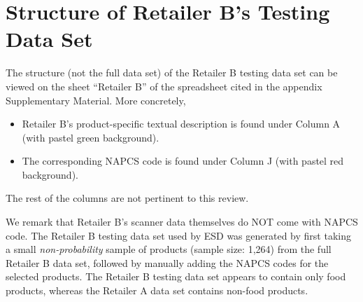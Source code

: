 
\section{Structure of Retailer B's Testing Data Set}
\setcounter{theorem}{0}
\setcounter{equation}{0}



The structure (not the full data set) of the Retailer B testing data set
can be viewed on the sheet ``Retailer B'' of the spreadsheet cited
in the appendix Supplementary Material.
More concretely,
\begin{itemize}
\item
	Retailer B's product-specific textual description is found
	under Column A (with pastel green background).
\item
	The corresponding NAPCS code is found under
	Column J (with pastel red background).	
\end{itemize}
The rest of the columns are not pertinent to this review.

\vskip 0.3cm
\noindent
We remark that Retailer B's scanner data themselves do NOT come
with NAPCS code. The Retailer B testing data set used by ESD was
generated by first taking a small \textit{non-probability} sample of
products (sample size: 1,264) from the full Retailer B data set,
followed by manually adding the NAPCS codes for the selected
products. The Retailer B testing data set appears to contain only
food products, whereas the Retailer A data set contains
non-food products.

